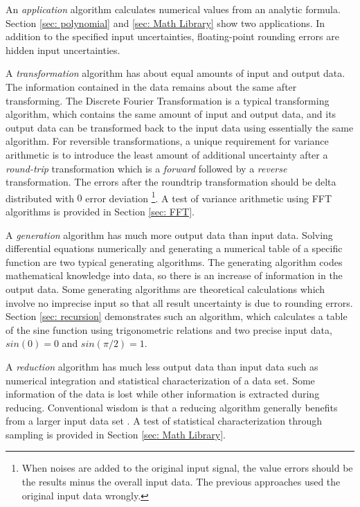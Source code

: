 \documentclass[twoside]{article}
\numberwithin{equation}{section}
\begin{document}
An \emph{application} algorithm calculates numerical values from an analytic formula. 
Section \ref{sec: polynomial} and \ref{sec: Math Library} show two applications.
In addition to the specified input uncertainties, floating-point rounding errors are hidden input uncertainties.

A \emph{transformation} algorithm has about equal amounts of input and output data.  
The information contained in the data remains about the same after transforming.  
The Discrete Fourier Transformation is a typical transforming algorithm, which contains the same amount of input and output data, and its output data can be transformed back to the input data using essentially the same algorithm.  
For reversible transformations, a unique requirement for variance arithmetic is to introduce the least amount of additional uncertainty after a \emph{round-trip} transformation which is a \emph{forward} followed by a \emph{reverse} transformation.  
The errors after the roundtrip transformation should be delta distributed with $0$ error deviation \footnote{When noises are added to the original input signal, the value errors should be the results minus the overall input data. The previous approaches \cite{Prev_Precision_Arithmetic} used the original input data wrongly.}.
A test of variance arithmetic using FFT algorithms is provided in Section \ref{sec: FFT}.

A \emph{generation} algorithm has much more output data than input data.  
Solving differential equations numerically and generating a numerical table of a specific function are two typical generating algorithms.  
The generating algorithm codes mathematical knowledge into data, so there is an increase of information in the output data.  
Some generating algorithms are theoretical calculations which involve no imprecise input so that all result uncertainty is due to rounding errors.  
Section \ref{sec: recursion} demonstrates such an algorithm, which calculates a table of the sine function using trigonometric relations and two precise input data, $sin(0)=0$ and $sin(\pi/2)=1$.  

A \emph{reduction} algorithm has much less output data than input data such as numerical integration and statistical characterization of a data set.  
Some information of the data is lost while other information is extracted during reducing.  
Conventional wisdom is that a reducing algorithm generally benefits from a larger input data set \cite{Probability_Statistics}.  
A test of statistical characterization through sampling is provided in Section \ref{sec: Math Library}.
\end{document}
